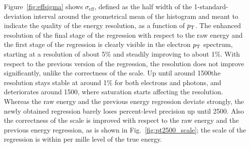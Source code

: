 Figure~\ref{fig:effsigma} shows $\sigma_\text{eff}$, defined as the half width of the 1-standard-deviation interval around the geometrical mean of the histogram and meant to indicate the quality of the energy resolution, as a function of $p_\mathrm{T}$.
% 
The enhanced resolution of the final stage of the regression with respect to the raw energy and the first stage of the regression is clearly visible in the electron $p_\mathrm{T}$ spectrum, starting at a resolution of about 5\% and steadily improving to about 1\%.
% 
With respect to the previous version of the regression, the resolution does not improve significantly, unlike the correctness of the scale.
% 
Up until around 1500\GeV the resolution stays stable at around 1\% for both electrons and photons, and deteriorates around 1500\GeV, where saturation starts affecting the resolution.
% 
Whereas the raw energy and the previous energy regression deviate strongly, the newly obtained regression barely loses percent-level precision up until 2500\GeV.
% 
Also the correctness of the scale is improved with respect to the raw energy and the previous energy regression, as is shown in Fig.~\ref{fig:pt2500_scale}; the scale of the regression is within per mille level of the true energy.


